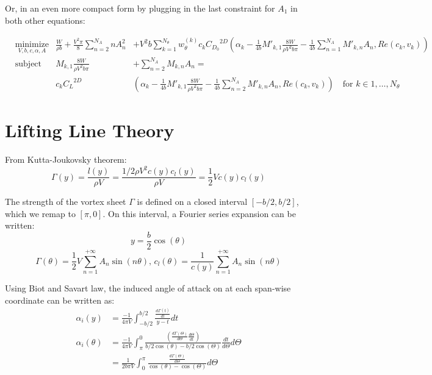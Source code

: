 \documentclass[letterpaper,12pt]{article}
\begin{document}
Or, in an even more compact form by plugging in the last constraint for $A_1$ in both other equations:

\begin{align*}
	& \underset{V, b, c, \alpha, A}{\text{minimize}} &
	\frac{W}{\rho b} + \frac{V^2 \pi}{8}\sum_{n=2}^{N_A} n A_{n}^2 &+
	  V^2 b  \sum_{k=1}^{N_{\theta}} w_{\theta}^{(k)} c_k {C_{D_0}}^{2D}
	  \left( \alpha_k
	  - \frac {1}{4b} M'_{k,1}\frac{8W}{\rho V^2 b \pi}
	  - \frac {1}{4b}\sum_{n=1}^{N_{A}}M'_{k,n}A_n , Re(c_k, v_k)
	  \right)\\
	& \text{subject to} &
 	M_{k, 1} \frac{8W}{\rho V^2 b \pi} &+ \sum_{n=2}^{N_{A}} M_{k,n} A_n = \\
	& & c_k{C_L}^{2D} & \left( \alpha_k
		 - \frac {1}{4b} M'_{k,1}\frac{8W}{\rho V^2 b \pi}
		 - \frac {1}{4b}\sum_{n=2}^{N_{A}}M'_{k,n}A_n , Re(c_k, v_k)\right)
		 \quad \text{for } k \in 1,\dots, N_{\theta}
\end{align*}

\section{Lifting Line Theory}

From Kutta-Joukovsky theorem:
%
$$\Gamma(y) = \frac{l(y)}{\rho V} = \frac{1/2 \rho V^2 c(y) c_l(y)}{\rho V} =  \frac{1}{2} V c(y) c_l(y)$$

The strength of the vortex sheet $\Gamma$ is defined on a closed interval $[-b/2, b/2]$, which we remap to $[\pi, 0]$. 
On this interval, a Fourier series expansion can be written:
$$y = \frac{b}{2}\cos(\theta)$$
%
$$\Gamma(\theta) = \frac{1}{2} V\sum_{n=1}^{+\infty} A_n \sin(n\theta) \text{,      } c_l(\theta) = \frac 1 {c(y)} \sum_{n=1}^{+\infty} A_n \sin(n\theta)$$

Using Biot and Savart law, the induced angle of attack on at each span-wise coordinate can be written as:
%
	\begin{align*}
		\alpha_i(y) &= \frac{-1}{4\pi V}\int_{-b/2}^{b/2} \frac{\frac{d\Gamma(t)}{dt}}{y-t} dt \\ 
		\alpha_i(\theta) &= \frac{-1}{4\pi V} \int_{\pi}^{0} \frac{\left( \frac{d\Gamma(\Theta)}{d\Theta} \frac{d\Theta}{dt}\right)}{b/2\cos(\theta)-b/2\cos(\Theta)}\frac{dt}{d\Theta} d\Theta	 \\
				 &= \frac{1}{2b\pi V} \int_{0}^{\pi} \frac{\frac{d\Gamma(\Theta)}{d\Theta}}{\cos(\theta)-\cos(\Theta)} d\Theta	
	\end{align*}
\end{document}
